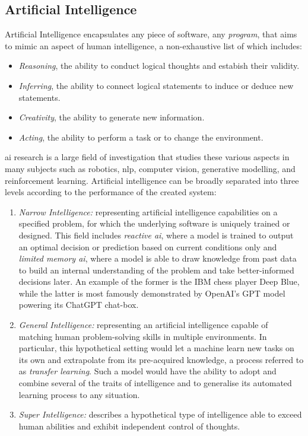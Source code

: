 \subsection{Artificial Intelligence}
Artificial Intelligence encapsulates any piece of software, any \textit{program}, that aims to mimic an aspect of human intelligence, a non-exhaustive list of which includes: 
\begin{itemize}
    \item \textit{Reasoning}, the ability to conduct logical thoughts and estabish their validity.
    \item \textit{Inferring}, the ability to connect logical statements to induce or deduce new statements.
    \item \textit{Creativity}, the ability to generate new information. 
    \item \textit{Acting}, the ability to perform a task or to change the environment.
\end{itemize}
\gls{ai} research is a large field of investigation that studies these various aspects in many subjects such as robotics, \gls{nlp}, computer vision, generative modelling, and reinforcement learning. Artificial intelligence can be broadly separated into three levels according to the performance of the created system: 
\begin{enumerate}
    \item \textit{Narrow Intelligence:} representing artificial intelligence capabilities on a specified problem, for which the underlying software is uniquely trained or designed. This field includes \textit{reactive \gls{ai}}, where a model is trained to output an optimal decision or prediction based on current conditions only and \textit{limited memory \gls{ai}}, where a model is able to draw knowledge from past data to build an internal understanding of the problem and take better-informed decisions later. An example of the former is the IBM chess player Deep Blue, while the latter is most famously demonstrated by OpenAI's GPT model powering its ChatGPT chat-box. 
    \item \textit{General Intelligence:} representing an artificial intelligence capable of matching human problem-solving skills in multiple environments. In particular, this hypothetical setting would let a machine learn new tasks on its own and extrapolate from its pre-acquired knowledge, a process referred to as \textit{transfer learning}. Such a model would have the ability to adopt and combine several of the traits of intelligence and to generalise its automated learning process to any situation.
    \item \textit{Super Intelligence:} describes a hypothetical type of intelligence able to exceed human abilities and exhibit independent control of thoughts. 
\end{enumerate}

